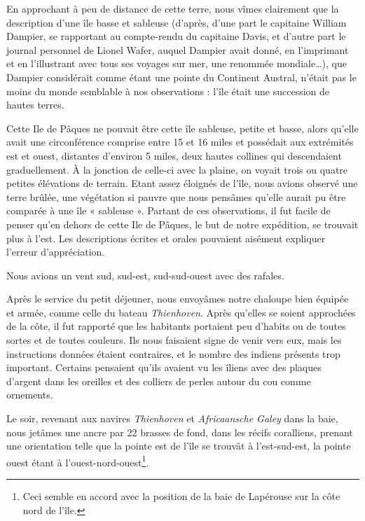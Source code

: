 \documentclass{article}
\begin{document}
        
    En approchant à peu de distance de cette terre, nous vîmes clairement que la description d'une île basse et sableuse (d'après, d'une part le capitaine William Dampier, se rapportant au compte-rendu du capitaine Davis, et d'autre part le journal personnel de Lionel Wafer, auquel Dampier avait donné, en l'imprimant et en l'illustrant avec tous ses voyages sur mer, une renommée mondiale…), que Dampier considérait comme étant une pointe du Continent Austral, n'était pas le moins du monde semblable à nos observations : l'île était une succession de hautes terres.
            
        
    Cette Ile de Pâques ne pouvait être cette île sableuse, petite et basse, alors qu'elle avait une circonférence comprise entre 15 et 16 miles et possédait aux extrémités est et ouest, distantes d'environ 5 miles, deux hautes collines qui descendaient graduellement. À la jonction de celle-ci avec la plaine, on voyait trois ou quatre petites élévations de terrain. Etant assez éloignés de l'île, nous avions observé une terre brûlée, une végétation si pauvre que nous pensâmes qu'elle aurait pu être comparée à une île « sableuse ». Partant de ces observations, il fut facile de penser qu'en dehors de cette Ile de Pâques, le but de notre expédition, se trouvait plus à l'est. Les descriptions écrites et orales pouvaient aisément expliquer l'erreur d'appréciation. 
            
        
    Nous avions un vent sud, sud-est, sud-sud-ouest avec des rafales.
            
        
    Après le service du petit déjeuner, nous envoyâmes notre chaloupe bien équipée et armée, comme celle du bateau \textit{Thienhoven}. Après qu'elles se soient approchées de la côte, il fut rapporté que les habitants portaient peu d'habits ou de toutes sortes et de toutes couleurs. Ils nous faisaient signe de venir vers eux, mais les instructions données étaient contraires, et le nombre des indiens présents trop important. Certains pensaient qu'ils avaient vu les îliens avec des plaques d'argent dans les oreilles et des colliers de perles autour du cou comme ornements. 
            
        
    Le soir, revenant aux navires \textit{Thienhoven} et \textit{Africaansche Galey} dans la baie, nous jetâmes une ancre par 22 brasses de fond, dans les récifs coralliens, prenant une orientation telle que la pointe est de l'île se trouvât à l'est-sud-est, la pointe ouest étant à l'ouest-nord-ouest\footnote{Ceci semble en accord avec la position de la baie de Lapérouse sur la côte nord de l'île.}.
            
\end{document}
